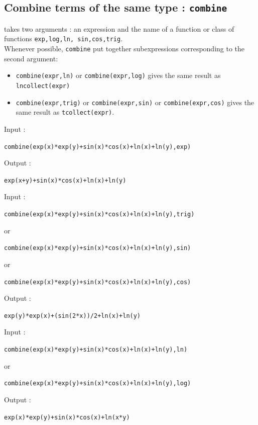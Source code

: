 \documentclass[a4paper,11pt]{book}
\begin{document}
\subsection{Combine terms of the same type  : {\tt combine}}
 takes two arguments : an expression and 
the name of a function or class of functions
{\tt exp,log,ln, sin,cos,trig}.\\
Whenever possible, {\tt combine} put together subexpressions corresponding
to the second argument:
\begin{itemize}
\item {\tt combine(expr,ln)} or {\tt combine(expr,log)} gives the same result 
as {\tt lncollect(expr)}
\item
{\tt combine(expr,trig)} or {\tt combine(expr,sin)}  or {\tt combine(expr,cos)}
gives the same result as {\tt tcollect(expr)}.
\end{itemize}
Input :
\begin{center}{\tt combine(exp(x)*exp(y)+sin(x)*cos(x)+ln(x)+ln(y),exp)}\end{center}
Output :
\begin{center}{\tt exp(x+y)+sin(x)*cos(x)+ln(x)+ln(y)}\end{center}
Input :
\begin{center}{\tt combine(exp(x)*exp(y)+sin(x)*cos(x)+ln(x)+ln(y),trig)}\end{center}
or
\begin{center}{\tt combine(exp(x)*exp(y)+sin(x)*cos(x)+ln(x)+ln(y),sin)}\end{center}
or
\begin{center}{\tt combine(exp(x)*exp(y)+sin(x)*cos(x)+ln(x)+ln(y),cos)}\end{center}
Output :
\begin{center}{\tt exp(y)*exp(x)+(sin(2*x))/2+ln(x)+ln(y)}\end{center}
Input :
\begin{center}{\tt combine(exp(x)*exp(y)+sin(x)*cos(x)+ln(x)+ln(y),ln)}\end{center}
or
\begin{center}{\tt combine(exp(x)*exp(y)+sin(x)*cos(x)+ln(x)+ln(y),log)}\end{center}
Output :
\begin{center}{\tt exp(x)*exp(y)+sin(x)*cos(x)+ln(x*y)}\end{center}
\end{document}
